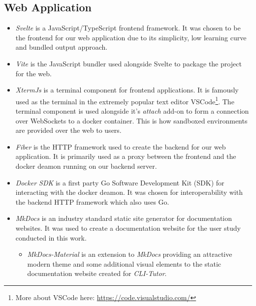 \subsection{Web Application}
\begin{itemize}
    \item \textit{Svelte} is a JavaScript/TypeScript frontend framework. It was
        chosen to be the frontend for our web application due to its
        simplicity, low learning curve and bundled output approach.

    \item \textit{Vite} is the JavaScript bundler used alongside Svelte to package the project for the web.

    \item \textit{XtermJs} is a terminal component for frontend applications.
        It is famously used as the terminal in the extremely popular text
        editor VSCode\footnote{More about VSCode here:
        \url{https://code.visualstudio.com/}}. The terminal component is used
        alongside it's \textit{attach} add-on to form a connection over
        WebSockets to a docker container. This is how sandboxed environments
        are provided over the web to users.

    \item \textit{Fiber} is the HTTP framework used to create the backend for
        our web application. It is primarily used as a proxy between the
        frontend and the docker deamon running on our backend server.

    \item \textit{Docker SDK} is a first party Go Software Development Kit
        (SDK) for interacting with the docker deamon. It was chosen for
        interoperability with the backend HTTP framework which also uses Go.

    \item \textit{MkDocs} is an industry standard static site generator for
        documentation websites. It was used to create a documentation website
        for the user study conducted in this work.
        \begin{itemize}
            \item \textit{MkDocs-Material} is an extension to \textit{MkDocs}
                providing an attractive modern theme and some additional visual
                elements to the static documentation website created for
                \textit{CLI-Tutor}.
        \end{itemize}
\end{itemize}

